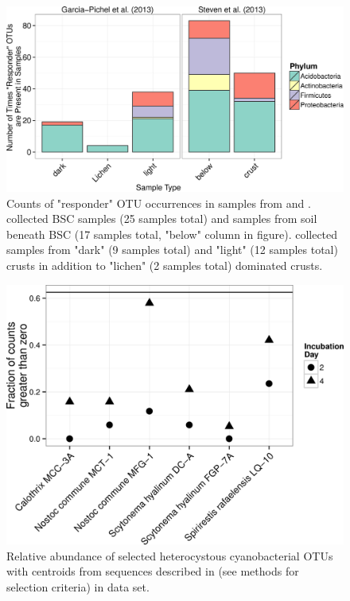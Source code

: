 \begin{figure}[h!]
  \centering
    \includegraphics[width=1.0\textwidth]{figures/rspndr_dist/rspndr_dist.png}
  \caption{Counts of "responder" OTU occurrences in samples from \citet{Steven_2013} and \citet{Garcia_Pichel_2013}. \citet{Steven_2013} collected BSC samples (25 samples total) and samples from soil beneath BSC (17 samples total, "below" column in figure). \citet{Garcia_Pichel_2013} collected samples from "dark" (9 samples total) and "light" (12 samples total) crusts in addition to "lichen" (2 samples total) dominated crusts.}
  \label{fig:rspndr_dist}
\end{figure}

\begin{figure}[h!]
  \centering
    \includegraphics[width=1.0\textwidth]{figures/het_sparsity/het_sparsity.png}
  \caption{Relative abundance of selected heterocystous cyanobacterial OTUs with centroids from sequences described in \citet{Yeager} (see methods for selection criteria) in \citet{Steven_2013} data set.}
  \label{fig:het_sparsity}
\end{figure}

